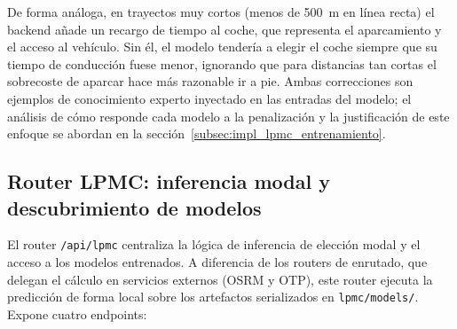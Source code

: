 De forma análoga, en trayectos muy cortos (menos de 500~m en línea recta) el backend añade un recargo de tiempo al coche, que representa el aparcamiento y el acceso al vehículo. Sin él, el modelo tendería a elegir el coche siempre que su tiempo de conducción fuese menor, ignorando que para distancias tan cortas el sobrecoste de aparcar hace más razonable ir a pie. Ambas correcciones son ejemplos de conocimiento experto inyectado en las entradas del modelo; el análisis de cómo responde cada modelo a la penalización y la justificación de este enfoque se abordan en la sección~\ref{subsec:impl_lpmc_entrenamiento}.

\subsection{Router LPMC: inferencia modal y descubrimiento de modelos}
\label{subsec:impl_backend_lpmc}

El router \texttt{/api/lpmc} centraliza la lógica de inferencia de elección modal y el acceso a los modelos entrenados. A diferencia de los routers de enrutado, que delegan el cálculo en servicios externos (OSRM y OTP), este router ejecuta la predicción de forma local sobre los artefactos serializados en \texttt{lpmc/models/}. Expone cuatro endpoints:

